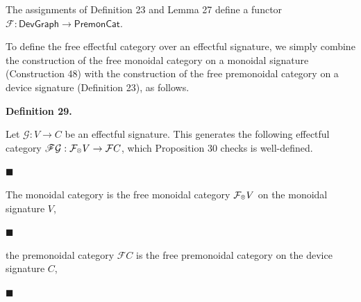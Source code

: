  
The assignments of Definition 23 and Lemma 27 define a functor $\mathcal{F}:\mathsf{DevGraph}\to\mathsf{PremonCat}$.\par
 
 
 
 
To define the free effectful category over an effectful signature, we simply combine the construction of the free monoidal category on a monoidal signature (Construction 48) with the construction of the free premonoidal category on a device signature (Definition 23), as follows.\par
 
 
 
\par\medskip\noindent\textbf{Definition 29.}\par
 
 
Let $\mathcal{G}:V\to C$ be an effectful signature. This generates the following effectful category $\mathscr{F}{\mathcal{G}}:\mathcal{F}_{\mathbin{\raisebox{1.25pt}{$\scriptscriptstyle\otimes$}}}V\to\mathcal{F}C$, which Proposition 30 checks is well-defined.\par
  
\par\noindent  $\blacksquare$ 
 
The monoidal category is the free monoidal category $\mathcal{F}_{\mathbin{\raisebox{1.25pt}{$\scriptscriptstyle\otimes$}}}V$ on the monoidal signature $V$,\par
 
 
 
\par\noindent  $\blacksquare$ 
 
the premonoidal category $\mathcal{F}{C}$ is the free premonoidal category on the device signature $C$,\par
 
 
 
\par\noindent  $\blacksquare$ 
 
